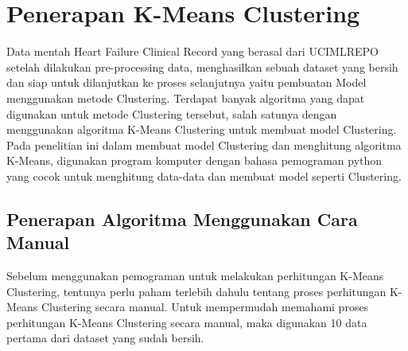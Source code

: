 \documentclass[english,12pt,a4paper,openany]{book}
\begin{document}
	\section{Penerapan K-Means Clustering}
	Data mentah Heart Failure Clinical Record yang berasal dari UCIMLREPO setelah dilakukan pre-processing data, menghasilkan sebuah dataset yang bersih dan siap untuk dilanjutkan ke proses selanjutnya yaitu pembuatan Model menggunakan metode Clustering. Terdapat banyak algoritma yang dapat digunakan untuk metode Clustering tersebut, salah satunya dengan menggunakan algoritma K-Means Clustering untuk membuat model Clustering. Pada penelitian ini dalam membuat model Clustering dan menghitung algoritma K-Means, digunakan program komputer dengan bahasa pemograman python yang cocok untuk menghitung data-data dan membuat model seperti Clustering.
	
	\subsection{Penerapan Algoritma Menggunakan Cara Manual}
	Sebelum menggunakan pemograman untuk melakukan perhitungan K-Means Clustering, tentunya perlu paham terlebih dahulu tentang proses perhitungan K-Means Clustering secara manual. Untuk mempermudah memahami proses perhitungan K-Means Clustering secara manual, maka digunakan 10 data pertama dari dataset yang sudah bersih.\\
	
	
	
\end{document}
